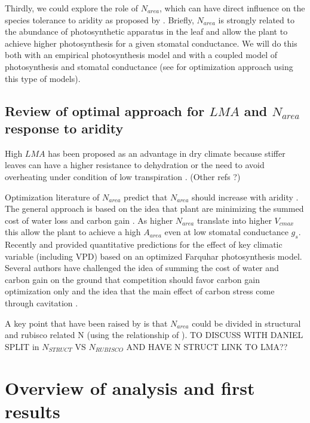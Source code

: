 \documentclass[a4paper,11pt]{article}
\begin{document}
Thirdly, we could explore the role of $N_{area}$, which can have direct influence on the species tolerance to aridity as proposed by \citet{Wright-2003}. Briefly, $N_{area}$ is strongly related to the abundance of photosynthetic apparatus in the leaf and allow the plant to achieve higher photosynthesis for a given stomatal conductance. We will do this both with an empirical photosynthesis model and with a coupled model of photosynthesis and stomatal conductance (see \citet{Prentice-2014,Wang-2017} for optimization approach using this type of models).


\subsection{Review of optimal approach for $LMA$ and $N_{area}$ response to aridity}

High $LMA$ has been proposed as an advantage in dry climate because
stiffer leaves can have a higher resistance to dehydration
\citep{Wright-2002a,Wright-2002b} or the need to avoid overheating
under condition of low transpiration \citep{Leigh-2012}. (Other refs ?)

Optimization literature of $N_{area}$ predict that $N_{area}$ should
increase with aridity \citep{Wright-2003}. The general approach is
based on the idea that plant are minimizing the summed cost of water
loss and carbon gain
\citep{Medlyn-2002,Wright-2003,Prentice-2014,Lu-2016,Wang-2017,Dong-2017}. As
higher $N_{area}$ translate into higher $V_{cmax}$ this allow the
plant to achieve a high $A_{area}$ even at low stomatal conductance
$g_s$. Recently \citet{Prentice-2014} and \citet{Dong-2017} provided
quantitative predictions for the effect of key climatic variable
(including VPD) based on an optimized Farquhar photosynthesis
model. Several authors have challenged the idea of summing the cost of
water and carbon gain on the ground that competition should favor
carbon gain optimization only \citep{Wolf-2016} and the idea that the
main effect of carbon stress come through cavitation \citep{Sperry-2016,Sperry-2017}.

A key point that have been raised by \citet{Dong-2017} is that
$N_{area}$ could be divided in structural and rubisco related N (using
the relationship of \citet{Onoda-2004}). {\color{red}TO DISCUSS WITH DANIEL SPLIT in $N_{STRUCT}$ VS $N_{RUBISCO}$ AND HAVE N STRUCT LINK TO LMA??}


\section{Overview of analysis and first results}
\end{document}
